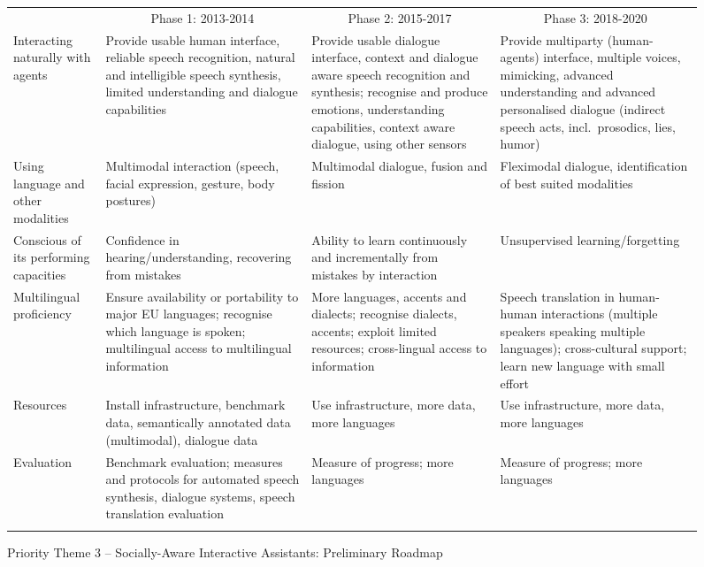 \documentclass[10pt, plain]{../../metanetpaper}
\begin{document}
\begin{multicols}{2}
\begin{figure}[htb]
  \centering
  \small
  \begin{tabular}{@{}p{2.5cm}p{4cm}p{4cm}p{4cm}@{}} \toprule\addlinespace
    \multicolumn{1}{c}{Research Priority} & \multicolumn{1}{c}{Phase 1: 2013-2014} & \multicolumn{1}{c}{Phase 2: 2015-2017} & \multicolumn{1}{c}{Phase 3: 2018-2020} \\ \addlinespace\midrule\addlinespace
    Interacting naturally with agents & Provide usable human interface, reliable speech recognition, natural and intelligible speech synthesis, limited understanding and dialogue capabilities & Provide usable dialogue interface, context and dialogue aware speech recognition and synthesis; recognise and produce emotions,  understanding capabilities, context aware dialogue, using other sensors & Provide multiparty (human-agents) interface, multiple voices, mimicking, advanced understanding and advanced personalised dialogue (indirect speech acts, incl.~prosodics, lies, humor) \\ \addlinespace
    Using language and other modalities & Multimodal interaction (speech, facial expression, gesture, body postures) & Multimodal dialogue, fusion and fission & Fleximodal dialogue, identification of best suited modalities \\ \addlinespace
    Conscious of its performing capacities & Confidence in hearing/understanding, recovering from mistakes & Ability to learn continuously and incrementally from mistakes by interaction & Unsupervised learning/forgetting \\ \addlinespace
    Multilingual proficiency & Ensure availability or portability to major EU languages; recognise which language is spoken; multilingual access to multilingual information & More languages, accents and dialects; recognise dialects, accents; exploit limited resources; cross-lingual access to information & Speech translation in human-human interactions (multiple speakers speaking multiple languages); cross-cultural support; learn new language with small effort \\ \addlinespace
    Resources & Install infrastructure, benchmark data, semantically annotated data (multimodal), dialogue data & Use infrastructure, more data, more languages & Use infrastructure, more data, more languages \\ \addlinespace
    Evaluation & Benchmark evaluation; measures and protocols for automated speech synthesis, dialogue systems, speech translation evaluation & Measure of progress; more languages & Measure of progress; more languages \\ \addlinespace\bottomrule
  \end{tabular}
  \caption{Priority Theme 3 -- Socially-Aware Interactive Assistants: Preliminary Roadmap}
  \label{fig:pt3-roadmap}
\end{figure}


\end{multicols}
\end{document}
